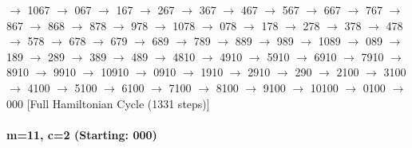 $\rightarrow$ 1067 $\rightarrow$ 067 $\rightarrow$ 167 $\rightarrow$ 267 $\rightarrow$ 367 $\rightarrow$ 467 $\rightarrow$ 567 $\rightarrow$ 667 $\rightarrow$ 767 $\rightarrow$ 867 $\rightarrow$ 868 $\rightarrow$ 878 $\rightarrow$ 978 $\rightarrow$ 1078 $\rightarrow$ 078 $\rightarrow$ 178 $\rightarrow$ 278 $\rightarrow$ 378 $\rightarrow$ 478 $\rightarrow$ 578 $\rightarrow$ 678 $\rightarrow$ 679 $\rightarrow$ 689 $\rightarrow$ 789 $\rightarrow$ 889 $\rightarrow$ 989 $\rightarrow$ 1089 $\rightarrow$ 089 $\rightarrow$ 189 $\rightarrow$ 289 $\rightarrow$ 389 $\rightarrow$ 489 $\rightarrow$ 4810 $\rightarrow$ 4910 $\rightarrow$ 5910 $\rightarrow$ 6910 $\rightarrow$ 7910 $\rightarrow$ 8910 $\rightarrow$ 9910 $\rightarrow$ 10910 $\rightarrow$ 0910 $\rightarrow$ 1910 $\rightarrow$ 2910 $\rightarrow$ 290 $\rightarrow$ 2100 $\rightarrow$ 3100 $\rightarrow$ 4100 $\rightarrow$ 5100 $\rightarrow$ 6100 $\rightarrow$ 7100 $\rightarrow$ 8100 $\rightarrow$ 9100 $\rightarrow$ 10100 $\rightarrow$ 0100 $\rightarrow$ 000 [Full Hamiltonian Cycle (1331 steps)]

\paragraph{m=11, c=2 (Starting: 000)}


